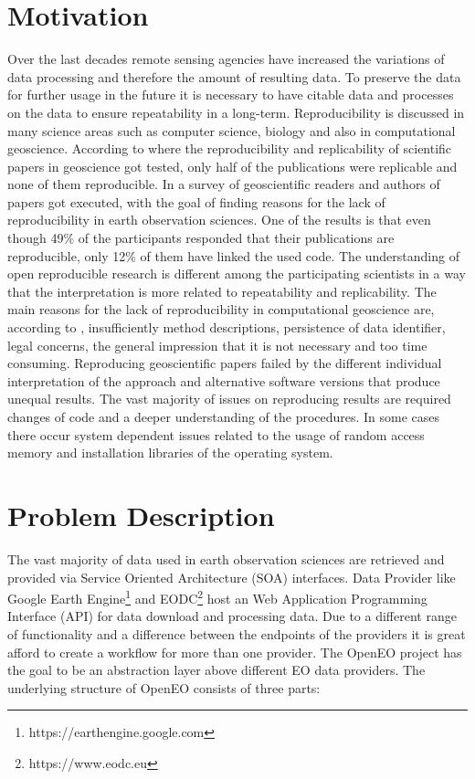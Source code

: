\documentclass[draft,final]{vutinfth} %
\begin{document}
\section{Motivation}\label{Motivation}
Over the last decades remote sensing agencies have increased the variations of data processing and therefore the amount of resulting data. To preserve the data for further usage in the future it is necessary to have citable data and processes on the data to ensure repeatability in a long-term.\cite{6352411} Reproducibility is discussed in many science areas such as computer science, biology and also in computational geoscience. According to \cite{Ostermann2017AdvancingSW} where the reproducibility and replicability of scientific papers in geoscience got tested, only half of the publications were replicable and none of them reproducible. In \cite{Thestateofreproducibility} a survey of geoscientific readers and authors of papers got executed, with the goal of finding reasons for the lack of reproducibility in earth observation sciences. One of the results is that even though 49\% of the participants responded that their publications are reproducible, only 12\% of them have linked the used code. The understanding of open reproducible research is different among the participating scientists in a way that the interpretation is more related to repeatability and replicability. The main reasons for the lack of reproducibility in computational geoscience are, according to \cite{Thestateofreproducibility}, insufficiently method descriptions, persistence of data identifier, legal concerns, the general impression that it is not necessary and too time consuming. 
Reproducing geoscientific papers failed by the different individual interpretation of the approach and alternative software versions that produce unequal results. The vast majority of issues on reproducing results are required changes of code and a deeper understanding of the procedures. In some cases there occur system dependent issues related to the usage of random access memory and installation libraries of the operating system. \cite{Thestateofreproducibility}

\section{Problem Description}\label{Problem}
The vast majority of data used in earth observation sciences are retrieved and provided via Service Oriented Architecture (SOA) interfaces. Data Provider like Google Earth Engine\footnote{https://earthengine.google.com} and EODC\footnote{https://www.eodc.eu} host an Web Application Programming Interface (API) for data download and processing data. Due to a different range of functionality and a difference between the endpoints of the providers it is great afford to create a workflow for more than one provider. The OpenEO project has the goal to be an abstraction layer above different EO data providers. The underlying structure of OpenEO consists of three parts:
\end{document}
